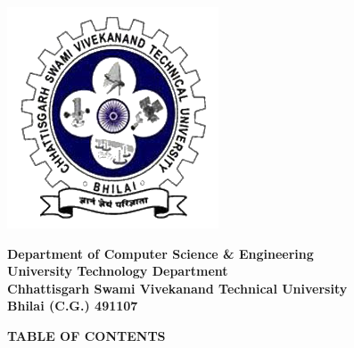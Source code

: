 \newpage
\thispagestyle{empty}
\begin{minipage}{0.17\textwidth}
  \centering
  \includegraphics[width=\textwidth]{images/logo.png}
\end{minipage}
\hfil
\large
\begin{minipage}{0.7\textwidth}
  \centering
  \textbf{Department of Computer Science \& Engineering}\\
  \textbf{University Technology Department}\\
  \textbf{Chhattisgarh Swami Vivekanand Technical University}\\
  \textbf{Bhilai (C.G.) 491107}
\end{minipage}

\noindent\makebox[\linewidth]{\rule{\textwidth}{0.4pt}}

\begin{center}
  \Large\textbf{TABLE OF CONTENTS}
\end{center}

\vspace{0.5cm}

